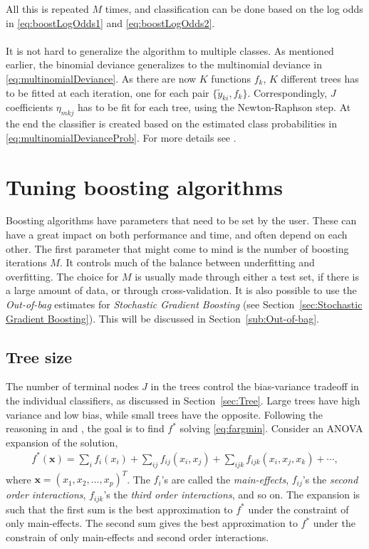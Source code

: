 All this is repeated $M$ times, and classification can be done based on the log odds in \eqref{eq:boostLogOdds1} and \eqref{eq:boostLogOdds2}. \\
\\
It is not hard to generalize the algorithm to multiple classes. As mentioned earlier, the binomial deviance generalizes to the multinomial deviance in \eqref{eq:multinomialDeviance}. As there are now $K$ functions $f_k$, $K$ different trees has to be fitted at each iteration, one for each pair $\{\tilde y_{k i}, f_k\}$. Correspondingly, $J$ coefficients $\eta_{m k j}$ has to be fit for each tree, using the Newton-Raphson step. At the end the classifier is created based on the estimated class probabilities in \eqref{eq:multinomialDevianceProb}. For more details see \cite{friedman}.

\section{Tuning boosting algorithms}
\label{sec:Tuning boosting algorithms}
Boosting algorithms have parameters that need to be set by the user. These can have a great impact on both performance and time, and often depend on each other. The first parameter that might come to mind is the number of boosting iterations $M$. It controls much of the balance between underfitting and overfitting. The choice for $M$ is usually made through either a test set, if there is a large amount of data, or through cross-validation. It is also possible to use the \textit{Out-of-bag} estimates for  \textit{Stochastic Gradient Boosting} (see Section~\ref{sec:Stochastic Gradient Boosting}). This will be discussed in Section~\ref{sub:Out-of-bag}.

\subsection{Tree size}
\label{sub:Tree size}
The number of terminal nodes $J$ in the trees control the bias-variance tradeoff in the individual classifiers, as discussed in Section~\ref{sec:Tree}.  Large trees have high variance and low bias, while small trees have the opposite.   Following the reasoning in \cite{modstat} and \cite{friedman}, the goal is to find $f^*$ solving \eqref{eq:fargmin}. Consider an ANOVA expansion of the solution,
\begin{align}
  \label{eq:ANOVAexpansion} 
  f^*(\mathbf{x}) = \sum_{i} f_i(x_i) + \sum_{ij} f_{ij}(x_i, x_j) + 
  \sum_{ijk} f_{ijk}(x_i, x_j, x_k) + \cdots,
\end{align}
where $\mathbf{x} = (x_1, x_2, \ldots, x_p)^T$. The $f_i$'s are called the \textit{main-effects}, $f_{ij}$'s the \textit{second order interactions}, $f_{ijk}$'s the \textit{third order interactions}, and so on. The expansion is such that the first sum is the best approximation to $f^*$ under the constraint of only main-effects. The second sum gives the best approximation to $f^*$ under the constrain of only main-effects and second order interactions. 

